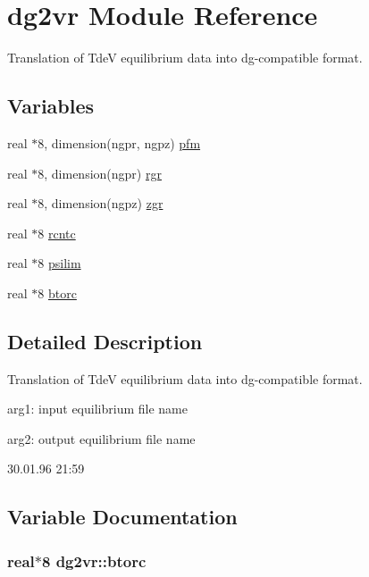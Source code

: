 \hypertarget{namespacedg2vr}{
\section{dg2vr Module Reference}
\label{namespacedg2vr}
}
Translation of TdeV equilibrium data into dg-compatible format.  


\subsection*{Variables}
\begin{CompactItemize}
\item 
real $\ast$8, dimension(ngpr, ngpz) \hyperlink{namespacedg2vr_1c53776a0c0432175658661a3696b407}{pfm}
\item 
real $\ast$8, dimension(ngpr) \hyperlink{namespacedg2vr_e39029b9c09d0a13620dd230984b8d91}{rgr}
\item 
real $\ast$8, dimension(ngpz) \hyperlink{namespacedg2vr_63bad1fd77a22251a8b6b79dbb51cf1f}{zgr}
\item 
real $\ast$8 \hyperlink{namespacedg2vr_aad7054333b6de374c00b4a621404770}{rcntc}
\item 
real $\ast$8 \hyperlink{namespacedg2vr_1ee5b4e2b358ea098d87fd41949e2c35}{psilim}
\item 
real $\ast$8 \hyperlink{namespacedg2vr_e4444ade57f6c4463aa02598cdb184af}{btorc}
\end{CompactItemize}


\subsection{Detailed Description}
Translation of TdeV equilibrium data into dg-compatible format. 

arg1: input equilibrium file name

arg2: output equilibrium file name

\begin{Desc}
\item[Version:]30.01.96 21:59 \end{Desc}


\subsection{Variable Documentation}
\hypertarget{namespacedg2vr_e4444ade57f6c4463aa02598cdb184af}{
\subsubsection[btorc]{\setlength{\rightskip}{0pt plus 5cm}real$\ast$8 {\bf dg2vr::btorc}}}
\label{namespacedg2vr_e4444ade57f6c4463aa02598cdb184af}




